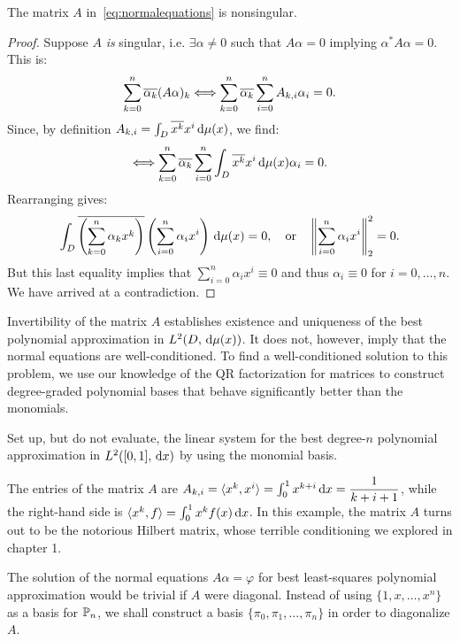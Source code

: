 \begin{theorem}
The matrix $A$ in~\eqref{eq:normalequations} is nonsingular.
\end{theorem}
\begin{proof}
Suppose $A$ {\em is} singular, i.e. $\exists \alpha\ne 0$ such that $A\alpha = 0$ implying $\alpha^* A\alpha = 0$. This is:
\begin{equation}
\sum_{k=0}^n\conj{\alpha_k}(A\alpha)_k \Longleftrightarrow \sum_{k=0}^n\conj{\alpha_k}\sum_{i=0}^nA_{k,i}\alpha_i = 0.
\end{equation}
Since, by definition $A_{k,i} = \int_D \conj{x^k}x^i\ud\mu(x)$, we find:
\begin{equation}
\Longleftrightarrow \sum_{k=0}^n \conj{\alpha_k} \sum_{i=0}^n \int_D \conj{x^k}x^i\ud\mu(x) \alpha_i = 0.
\end{equation}
Rearranging gives:
\begin{equation}
\int_D\conj{\pr(\sum_{k=0}^n \alpha_kx^k)}\pr(\sum_{i=0}^n \alpha_ix^i)\ud\mu(x) = 0,\quad{\rm or}\quad \left\|\sum_{i=0}^n \alpha_i x^i\right\|_2^2 = 0.
\end{equation}
But this last equality implies that $\sum_{i=0}^n\alpha_ix^i\equiv0$ and thus $\alpha_i\equiv0$ for $i=0,\ldots,n$. We have arrived at a contradiction.
\end{proof}
Invertibility of the matrix $A$ establishes existence and uniqueness of the best polynomial approximation in $L^2(D,\ud\mu(x))$. It does not, however, imply that the normal equations are well-conditioned. To find a well-conditioned solution to this problem, we use our knowledge of the QR factorization for matrices to construct degree-graded polynomial bases that behave significantly better than the monomials.

\begin{example}
Set up, but do not evaluate, the linear system for the best degree-$n$ polynomial approximation in $L^2([0,1],\ud x)$ by using the monomial basis.

The entries of the matrix $A$ are $A_{k,i} = \langle x^k, x^i\rangle = \int_0^1 x^{k+i}\ud x = \dfrac{1}{k+i+1}$, while the right-hand side is $\langle x^k, f\rangle = \int_0^1x^k f(x)\ud x$. In this example, the matrix $A$ turns out to be the notorious Hilbert matrix, whose terrible conditioning we explored in chapter 1.
\end{example}

The solution of the normal equations $A\alpha = \varphi$ for best least-squares polynomial approximation would be trivial if $A$ were diagonal. Instead of using $\{1,x,\ldots,x^n\}$ as a basis for $\P_n$, we shall construct a basis $\{\pi_0,\pi_1,\ldots,\pi_n\}$ in order to diagonalize $A$.

